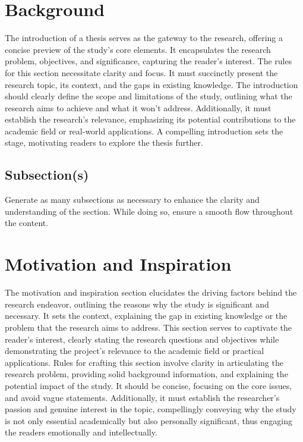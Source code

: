 % 
\section{Background}
\label{introduction:background}
% 
The introduction of a thesis serves as the gateway to the research, offering a concise preview of the study's core elements. It encapsulates the research problem, objectives, and significance, capturing the reader's interest. The rules for this section necessitate clarity and focus. It must succinctly present the research topic, its context, and the gaps in existing knowledge. The introduction should clearly define the scope and limitations of the study, outlining what the research aims to achieve and what it won't address. Additionally, it must establish the research's relevance, emphasizing its potential contributions to the academic field or real-world applications. A compelling introduction sets the stage, motivating readers to explore the thesis further.


% 
\subsection{Subsection(s)}
\label{introduction:background:example}
% 
Generate as many subsections as necessary to enhance the clarity and understanding of the section. While doing so, ensure a smooth flow throughout the content.


% 
\section{Motivation and Inspiration}
\label{introduction:motivation}
% 
The motivation and inspiration section elucidates the driving factors behind the research endeavor, outlining the reasons why the study is significant and necessary. It sets the context, explaining the gap in existing knowledge or the problem that the research aims to address. This section serves to captivate the reader's interest, clearly stating the research questions and objectives while demonstrating the project's relevance to the academic field or practical applications. Rules for crafting this section involve clarity in articulating the research problem, providing solid background information, and explaining the potential impact of the study. It should be concise, focusing on the core issues, and avoid vague statements. Additionally, it must establish the researcher's passion and genuine interest in the topic, compellingly conveying why the study is not only essential academically but also personally significant, thus engaging the readers emotionally and intellectually.


